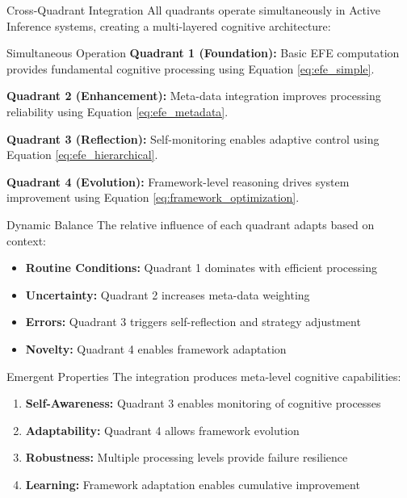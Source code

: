 \documentclass[
  ignorenonframetext,
]{beamer}
\providecommand{\tightlist}{%
  \setlength{\itemsep}{0pt}\setlength{\parskip}{0pt}}
\begin{document}
\begin{frame}
\begin{block}{Cross-Quadrant Integration}
\protect{}\label{sec:cross_quadrant_integration}
All quadrants operate simultaneously in Active Inference systems,
creating a multi-layered cognitive architecture:

\begin{block}{Simultaneous Operation}
\protect{}\label{simultaneous-operation}
\textbf{Quadrant 1 (Foundation):} Basic EFE computation provides
fundamental cognitive processing using Equation \eqref{eq:efe_simple}.

\textbf{Quadrant 2 (Enhancement):} Meta-data integration improves
processing reliability using Equation \eqref{eq:efe_metadata}.

\textbf{Quadrant 3 (Reflection):} Self-monitoring enables adaptive
control using Equation \eqref{eq:efe_hierarchical}.

\textbf{Quadrant 4 (Evolution):} Framework-level reasoning drives system
improvement using Equation \eqref{eq:framework_optimization}.
\end{block}

\begin{block}{Dynamic Balance}
\protect{}\label{dynamic-balance}
The relative influence of each quadrant adapts based on context:

\begin{itemize}
\tightlist
\item
  \textbf{Routine Conditions:} Quadrant 1 dominates with efficient
  processing
\item
  \textbf{Uncertainty:} Quadrant 2 increases meta-data weighting
\item
  \textbf{Errors:} Quadrant 3 triggers self-reflection and strategy
  adjustment
\item
  \textbf{Novelty:} Quadrant 4 enables framework adaptation
\end{itemize}
\end{block}

\begin{block}{Emergent Properties}
\protect{}\label{emergent-properties}
The integration produces meta-level cognitive capabilities:

\begin{enumerate}
\tightlist
\item
  \textbf{Self-Awareness:} Quadrant 3 enables monitoring of cognitive
  processes
\item
  \textbf{Adaptability:} Quadrant 4 allows framework evolution
\item
  \textbf{Robustness:} Multiple processing levels provide failure
  resilience
\item
  \textbf{Learning:} Framework adaptation enables cumulative improvement
\end{enumerate}
\end{block}
\end{block}
\end{frame}
\end{document}
